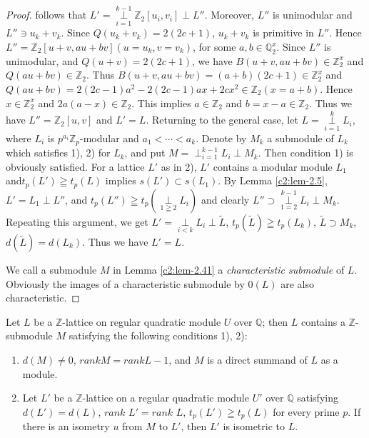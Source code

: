 \begin{proof}
follows that $L'=\mathop{\perp}\limits^{k-1}_{i=1}\mathbb{Z}_2
[u_i,v_i] \perp L''$. Moreover, $L''$ is unimodular and $L''\ni u_k
+v_k$. Since $Q(u_k+v_k)=2(2c+1)$, $u_k + v_k$ is primitive in
$L''$. Hence $L''=\mathbb{Z}_2 [u+v, au+bv](u=u_k, v=v_k)$, for some
$a,b \in \mathbb{Q}^x_2$. Since $L''$ is unimodular, and
$Q(u+v)=2(2c+1)$, we have $B(u+v, au+bv)\in \mathbb{Z}^x_2$
and $Q(au+bv)\in \mathbb{Z}_2$. Thus $B(u+v,
au+bv)=(a+b)(2c+1)\in \mathbb{Z}^x_2$ and $Q(au+bv) = 2(2c-1)
a^2 -2(2c-1) ax + 2cx^2 \in \mathbb{Z}_2 (x=a+b)$. Hence $x\in
\mathbb{Z}^x_2$ and $2a(a-x) \in \mathbb{Z}_2$. This implies
$a\in \mathbb{Z}_2$ and $b=x-a\in \mathbb{Z}_2$. Thus
we have $L''=\mathbb{Z}_2[u,v]$ and $L'=L$. Returning to the general
case, let $L=\mathop{\perp}\limits^k_{i=1} L_i$, where $L_i$ is
$p^{a_i} \mathbb{Z}_p$-modular and $a_1 <\cdots <a_k$. Denote by $M_k$
a submodule of $L_k$ which satisfies 1), 2) for $L_k$, and put
$M=\mathop{\perp}^{k-1}_{i=1} L_i \perp M_k$. Then condition 1) is
obviously satisfied. For a lattice $L'$ as in 2), $L'$ contains a
modular module $L_1$ and\pageoriginale $t_p(L') \geqq t_p(L)$ implies
$s(L') \subset s (L_1)$. By Lemma \ref{c2:lem-2.5}, $L'=L_1 \perp L''$, and
$t_p(L'') \geqq t_p (\mathop{\perp}\limits_{1\geqq 2} L_i)$ and
clearly $L''\supset \mathop{\perp}\limits^{k-1}_{1=2} L_i \perp
M_k$. Repeating this argument, we get $L'
= \mathop{\perp}\limits_{i<k} L_i \perp \tilde{L}$,
$t_p(\tilde{L}) \geqq t_p (L_k)$, $\tilde{L} \supset M_k$,
$d(\tilde{L}) = d(L_k)$. Thus we have $L'=L$.

We call a submodule $M$ in Lemma \ref{c2:lem-2.41} a \textit{characteristic
submodule} of $L$. Obviously the images of a characteristic submodule
by $0(L)$ are also characteristic.
\end{proof}

\setcounter{theorem}{41}
\begin{theorem}\label{c2:thm-2.42}
Let $L$ be a $\mathbb{Z}$-lattice on regular quadratic module $U$ over
$\mathbb{Q}$; then $L$ contains a $\mathbb{Z}$-submodule $M$
satisfying the following conditions 1), 2): 
\begin{enumerate}
\renewcommand{\labelenumi}{\theenumi)}
\item $d(M) \neq 0$, $rank M=rank L-1$, and $M$ is a direct summand of
$L$ as a module.

\item Let $L'$ be a $\mathbb{Z}$-lattice on a regular quadratic module
$U'$ over $\mathbb{Q}$ satisfying $d(L')=d(L)$, $rank$ $L'=rank$ $L$,
$t_p(L') \geqq t_p(L)$ for every prime $p$. If there is an isometry
$u$ from $M$ to $L'$, then $L'$ is isometric to $L$. 
\end{enumerate}
\end{theorem}

